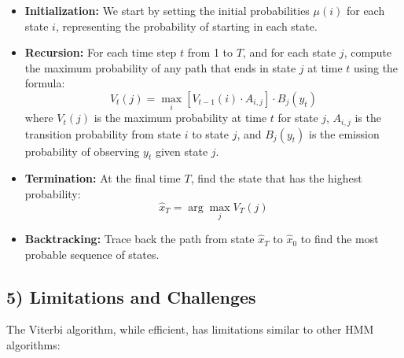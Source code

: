 \documentclass[10pt]{article}
\begin{document}
\begin{itemize}
  \item \textbf{Initialization:} We start by setting the initial probabilities \( \mu(i) \) for each state \( i \), representing the probability of starting in each state.
  
  \item \textbf{Recursion:} For each time step \( t \) from 1 to \( T \), and for each state \( j \), compute the maximum probability of any path that ends in state \( j \) at time \( t \) using the formula:
\[ V_t(j) = \max_{i} \left[ V_{t-1}(i) \cdot A_{i,j} \right] \cdot B_j(y_t) \]
where \( V_t(j) \) is the maximum probability at time \( t \) for state \( j \), \( A_{i,j} \) is the transition probability from state \( i \) to state \( j \), and \( B_j(y_t) \) is the emission probability of observing \( y_t \) given state \( j \).

  \item \textbf{Termination:} At the final time \( T \), find the state that has the highest probability:
\[ \hat{x}_T = \arg \max_{j} V_T(j) \]

  \item \textbf{Backtracking:} Trace back the path from state \( \hat{x}_T \) to \( \hat{x}_0 \) to find the most probable sequence of states.
\end{itemize}

\subsection*{5) Limitations and Challenges}
The Viterbi algorithm, while efficient, has limitations similar to other HMM algorithms:
\end{document}
